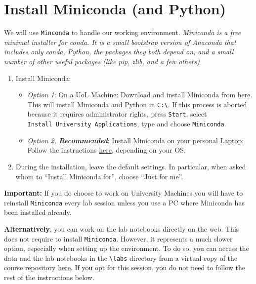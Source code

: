 \documentclass[
  letterpaper,
  DIV=11,
  numbers=noendperiod]{scrreprt}
\providecommand{\tightlist}{%
  \setlength{\itemsep}{0pt}\setlength{\parskip}{0pt}}\usepackage{longtable,booktabs,array}
\begin{document}
\section*{Install Miniconda (and
Python)}\label{install-miniconda-and-python}


We will use \texttt{Minconda} to handle our working environment.
\emph{Miniconda is a free minimal installer for conda. It is a small
bootstrap version of Anaconda that includes only conda, Python, the
packages they both depend on, and a small number of other useful
packages (like pip, zlib, and a few others)}

\begin{enumerate}
\def\labelenumi{\arabic{enumi}.}
\tightlist
\item
  Install Miniconda:

  \begin{itemize}
  \tightlist
  \item
    \emph{Option 1}: On a UoL Machine: Download and install Miniconda
    from
    \href{https://repo.anaconda.com/miniconda/Miniconda3-latest-Windows-x86_64.exe}{here}.
    This will install Miniconda and Python in
    \texttt{C:\textbackslash{}}. If this process is aborted because it
    requires administrator rights, press \texttt{Start}, select
    \texttt{Install\ University\ Applications}, type and choose
    \texttt{Miniconda}.
  \item
    \emph{Option 2, \textbf{Recommended}}: Install Miniconda on your
    personal Laptop: Follow the instructions
    \href{https://docs.conda.io/projects/miniconda/en/latest/miniconda-install.html}{here},
    depending on your OS.
  \end{itemize}
\item
  During the installation, leave the default settings. In particular,
  when asked whom to ``Install Miniconda for'', choose ``Just for me''.
\end{enumerate}

\textbf{Important:} If you do choose to work on University Machines you
will have to reinstall \texttt{Miniconda} every lab session unless you
use a PC where Miniconda has been installed already.

\textbf{Alternatively}, you can work on the lab notebooks directly on
the web. This does not require to install \texttt{Miniconda}. However,
it represents a much slower option, especially when setting up the
environment. To do so, you can access the data and the lab notebooks in
the \texttt{\textbackslash{}labs} directory from a virtual copy of the
course repository
\href{https://mybinder.org/v2/gh/GDSL-UL/wma/HEAD}{here}. If you opt for
this session, you do not need to follow the rest of the instructions
below.
\end{document}
